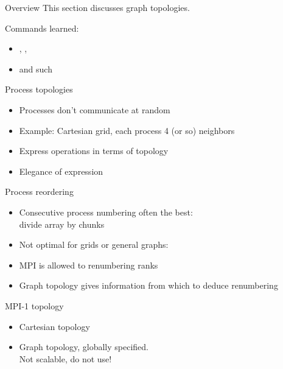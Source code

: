 
\begin{numberedframe}{Overview}
  This section discusses graph topologies.

  Commands learned:
  \begin{itemize}
  \item {}, ,
  \item {} and such
  \end{itemize}
\end{numberedframe}

\begin{numberedframe}{Process topologies}
  \begin{itemize}
  \item Processes don't communicate at random
  \item Example: Cartesian grid, each process 4 (or so) neighbors
  \item Express operations in terms of topology
  \item Elegance of expression
  \end{itemize}
\end{numberedframe}

\begin{numberedframe}{Process reordering}
  \begin{itemize}
  \item Consecutive process numbering often the best:\\
    divide array by chunks
  \item Not optimal for grids or general graphs:
  \item MPI is allowed to renumbering ranks
  \item Graph topology gives information from which to deduce
    renumbering
  \end{itemize}
\end{numberedframe}

\begin{numberedframe}{MPI-1 topology}
  \begin{itemize}
  \item Cartesian topology
  \item Graph topology, globally specified.\\
    Not scalable, do not use!
  \end{itemize}
\end{numberedframe}

